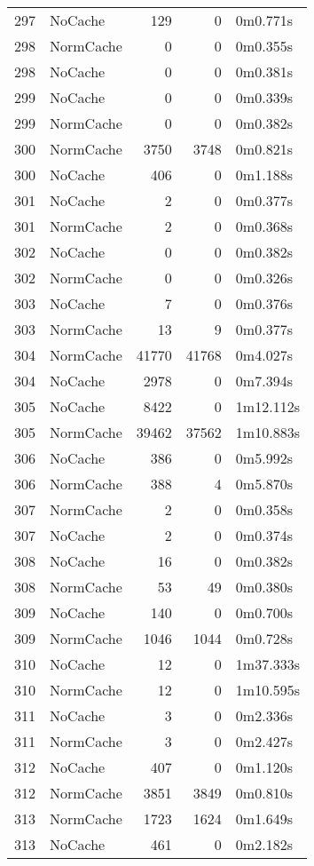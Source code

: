 \begin{tabular}{llrrl}
297 & NoCache & 129 & 0 & 0m0.771s \\
298 & NormCache & 0 & 0 & 0m0.355s \\
298 & NoCache & 0 & 0 & 0m0.381s \\
299 & NoCache & 0 & 0 & 0m0.339s \\
299 & NormCache & 0 & 0 & 0m0.382s \\
300 & NormCache & 3750 & 3748 & 0m0.821s \\
300 & NoCache & 406 & 0 & 0m1.188s \\
301 & NoCache & 2 & 0 & 0m0.377s \\
301 & NormCache & 2 & 0 & 0m0.368s \\
302 & NoCache & 0 & 0 & 0m0.382s \\
302 & NormCache & 0 & 0 & 0m0.326s \\
303 & NoCache & 7 & 0 & 0m0.376s \\
303 & NormCache & 13 & 9 & 0m0.377s \\
304 & NormCache & 41770 & 41768 & 0m4.027s \\
304 & NoCache & 2978 & 0 & 0m7.394s \\
305 & NoCache & 8422 & 0 & 1m12.112s \\
305 & NormCache & 39462 & 37562 & 1m10.883s \\
306 & NoCache & 386 & 0 & 0m5.992s \\
306 & NormCache & 388 & 4 & 0m5.870s \\
307 & NormCache & 2 & 0 & 0m0.358s \\
307 & NoCache & 2 & 0 & 0m0.374s \\
308 & NoCache & 16 & 0 & 0m0.382s \\
308 & NormCache & 53 & 49 & 0m0.380s \\
309 & NoCache & 140 & 0 & 0m0.700s \\
309 & NormCache & 1046 & 1044 & 0m0.728s \\
310 & NoCache & 12 & 0 & 1m37.333s \\
310 & NormCache & 12 & 0 & 1m10.595s \\
311 & NoCache & 3 & 0 & 0m2.336s \\
311 & NormCache & 3 & 0 & 0m2.427s \\
312 & NoCache & 407 & 0 & 0m1.120s \\
312 & NormCache & 3851 & 3849 & 0m0.810s \\
313 & NormCache & 1723 & 1624 & 0m1.649s \\
313 & NoCache & 461 & 0 & 0m2.182s \\

\end{tabular}
